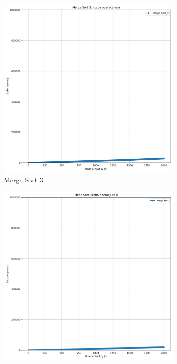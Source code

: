 \documentclass[11pt,a4paper]{article}
\begin{document}
\begin{figure}[h]
  \begin{subfigure}{.32\textwidth}
    \centering\includegraphics[width=\linewidth]{merge_sort_3.png}
    \caption{Merge Sort 3}
  \end{subfigure}
  \begin{subfigure}{.32\textwidth}
    \centering\includegraphics[width=\linewidth]{heap_sort.png}

\end{subfigure}
\end{figure}
\end{document}

